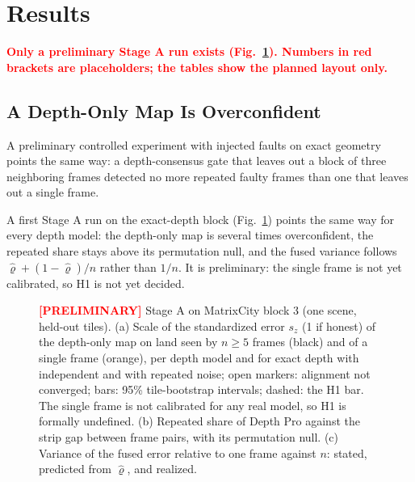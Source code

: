\section{Results}
\label{sec:results}
\textcolor{red}{\textbf{Only a preliminary Stage A run exists (Fig.~\ref{fig:law}). Numbers in red brackets
are placeholders; the tables show the planned layout only.}}

\subsection{A Depth-Only Map Is Overconfident}
\label{sec:results:law}
A preliminary controlled experiment with injected faults on exact geometry points the same way: a
depth-consensus gate that leaves out a block of three neighboring frames detected no more repeated faulty
frames than one that leaves out a single frame. 

A first Stage A run on the exact-depth block (Fig.~\ref{fig:law}) points the same way for every depth model:
the depth-only map is several times overconfident, the repeated share stays above its permutation null, and
the fused variance follows $\hat\varrho+(1-\hat\varrho)/n$ rather than $1/n$. It is preliminary: the single
frame is not yet calibrated, so H1 is not yet decided. 

\begin{figure}[!t]
\centering

\caption{\textcolor{red}{\textbf{[PRELIMINARY]}} Stage A on MatrixCity block 3 (one scene, held-out tiles). (a) Scale of
the standardized error $s_z$ (1 if honest) of the depth-only map on land seen by $n\ge5$ frames (black) and
of a single frame (orange), per depth model and for exact depth with independent and with repeated noise;
open markers: alignment not converged; bars: 95\% tile-bootstrap intervals; dashed: the H1 bar. The single
frame is not calibrated for any real model, so H1 is formally undefined. (b) Repeated share of Depth Pro
against the strip gap between frame pairs, with its permutation null. (c) Variance of the fused error relative
to one frame against $n$: stated, predicted from $\hat\varrho$, and realized.}
\label{fig:law}
\end{figure}

